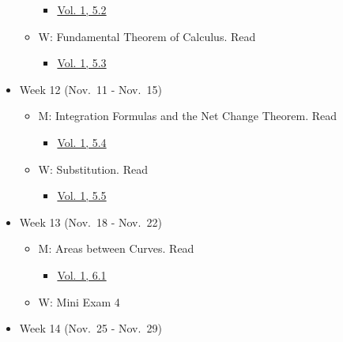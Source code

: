 \documentclass[
]{article}
\providecommand{\tightlist}{%
  \setlength{\itemsep}{0pt}\setlength{\parskip}{0pt}}
\begin{document}
\begin{itemize}
\begin{itemize}
    \begin{itemize}
    \tightlist
    \item
      \href{https://openstax.org/books/calculus-volume-1/pages/5-2-the-definite-integral}{Vol. 1, 5.2}
    \end{itemize}
  \item
    W: Fundamental Theorem of Calculus. Read

    \begin{itemize}
    \tightlist
    \item
      \href{https://openstax.org/books/calculus-volume-1/pages/5-3-the-fundamental-theorem-of-calculus}{Vol. 1, 5.3}
    \end{itemize}
  \end{itemize}
\item
  Week 12 (Nov.~11 - Nov.~15)

  \begin{itemize}
  \tightlist
  \item
    M: Integration Formulas and the Net Change Theorem. Read

    \begin{itemize}
    \tightlist
    \item
      \href{https://openstax.org/books/calculus-volume-1/pages/5-4-integration-formulas-and-the-net-change-theorem}{Vol. 1, 5.4}
    \end{itemize}
  \item
    W: Substitution. Read

    \begin{itemize}
    \tightlist
    \item
      \href{https://openstax.org/books/calculus-volume-1/pages/5-5-substitution}{Vol. 1, 5.5}
    \end{itemize}
  \end{itemize}
\item
  Week 13 (Nov.~18 - Nov.~22)

  \begin{itemize}
  \tightlist
  \item
    M: Areas between Curves. Read

    \begin{itemize}
    \tightlist
    \item
      \href{https://openstax.org/books/calculus-volume-1/pages/6-1-areas-between-curves}{Vol. 1, 6.1}
    \end{itemize}
  \item
    W: Mini Exam 4
  \end{itemize}
\item
  Week 14 (Nov.~25 - Nov.~29)


\end{itemize}
\end{document}
